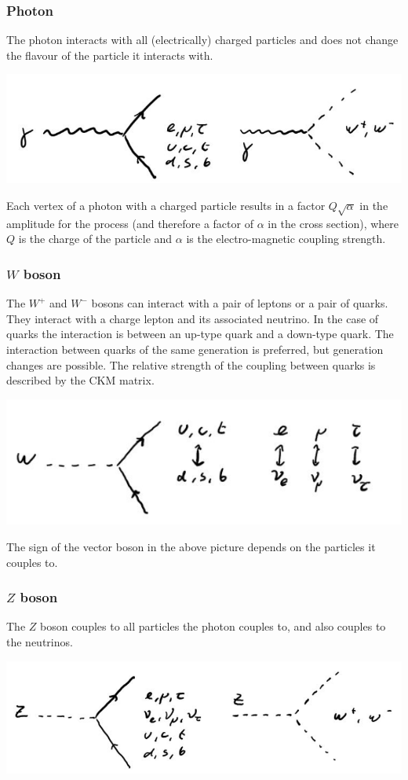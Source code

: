 \documentclass[12pt]{article}
\begin{document}
\subsubsection{Photon}
The photon interacts with all (electrically) charged particles and does not change the flavour of the particle it interacts with.
\begin{center}
\includegraphics[scale=0.4]{images/gamma.png}
\end{center}
Each vertex of a photon with a charged particle results in a factor $Q\sqrt{\alpha}$ in the amplitude for the process (and therefore a factor of $\alpha$ in the cross section), where $Q$ is the charge of the particle and $\alpha$ is the electro-magnetic coupling strength. 
\subsubsection{$W$ boson}
The $W^+$ and $W^-$ bosons can interact with a pair of leptons or a pair of quarks. They interact with a charge lepton and its associated neutrino. In the case of quarks the interaction is between an up-type quark and a down-type quark. The interaction between quarks of the same generation is preferred, but generation changes are possible. The relative strength of the coupling between quarks is described by the CKM matrix. 
\begin{center}
\includegraphics[scale=0.4]{images/W.png}
\end{center}
The sign of the vector boson in the above picture depends on the particles it couples to.
\subsubsection{$Z$ boson}
The $Z$ boson couples to all particles the photon couples to, and also couples to the neutrinos.
\begin{center}
\includegraphics[scale=0.4]{images/Z.png}
\end{center}
\end{document}
